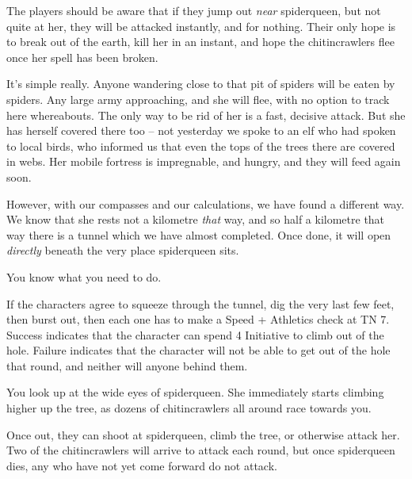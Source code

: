 \begin{multicols}{2}
The players should be aware that if they jump out \emph{near} \gls{spiderqueen}, but not quite at her, they will be attacked instantly, and for nothing.  Their only hope is to break out of the earth, kill her in an instant, and hope the chitincrawlers flee once her spell has been broken.

\begin{speechtext}

	It's simple really.  Anyone wandering close to that pit of spiders will be eaten by spiders.  Any large army approaching, and she will flee, with no option to track here whereabouts.  The only way to be rid of her is a fast, decisive attack.  But she has herself covered there too -- not yesterday we spoke to an elf who had spoken to local birds, who informed us that even the tops of the trees there are covered in webs.  Her mobile fortress is impregnable, and hungry, and they will feed again soon.

	However, with our compasses and our calculations, we have found a different way.
	We know that she rests not a kilometre \emph{that} way, and so half a kilometre that way there is a tunnel which we have almost completed.
	Once done, it will open \emph{directly} beneath the very place \gls{spiderqueen} sits.

	You know what you need to do.

\end{speechtext}

If the characters agree to squeeze through the tunnel, dig the very last few feet, then burst out, then each one has to make a Speed + Athletics check at TN 7.  Success indicates that the character can spend 4 Initiative to climb out of the hole.  Failure indicates that the character will not be able to get out of the hole that round, and neither will anyone behind them.

\begin{boxtext}

	You look up at the wide eyes of \gls{spiderqueen}. She immediately starts climbing higher up the tree, as dozens of chitincrawlers all around race towards you.

\end{boxtext}

Once out, they can shoot at \gls{spiderqueen}, climb the tree, or otherwise attack her.  Two of the chitincrawlers will arrive to attack each round, but once \gls{spiderqueen} dies, any who have not yet come forward do not attack.

\keras


\end{multicols}
